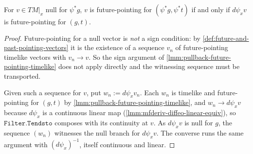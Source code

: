 \begin{lemma}
    \label{lmm:pullback-future-pointing-null}
    \leanok
    For $v \in TM|_x$ null for $\psi^*g$, $v$ is future-pointing for $(\psi^*g, \psi^*t)$ if and only if $d\psi_x v$ is future-pointing for $(g,t)$.
\end{lemma}
\begin{proof}
    \leanok
    Future-pointing for a null vector is \emph{not} a sign condition: by \ref{def:future-and-past-pointing-vectors} it is the existence of a sequence $v_n$ of future-pointing timelike vectors with $v_n \to v$. So the sign argument of \ref{lmm:pullback-future-pointing-timelike} does not apply directly and the witnessing sequence must be transported.

    Given such a sequence for $v$, put $w_n := d\psi_x v_n$. Each $w_n$ is timelike and future-pointing for $(g,t)$ by \ref{lmm:pullback-future-pointing-timelike}, and $w_n \to d\psi_x v$ because $d\psi_x$ is a continuous linear map (\ref{lmm:mfderiv-diffeo-linear-equiv}), so $\mathtt{Filter.Tendsto}$ composes with its continuity at $v$. As $d\psi_x v$ is null for $g$, the sequence $(w_n)$ witnesses the null branch for $d\psi_x v$. The converse runs the same argument with $(d\psi_x)^{-1}$, itself continuous and linear.
\end{proof}

